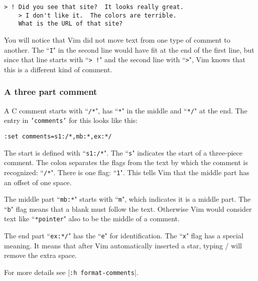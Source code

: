 \begin{Verbatim}[samepage=true]
    > ! Did you see that site?  It looks really great. 
    > I don't like it.  The colors are terrible. 
    What is the URL of that site? 
\end{Verbatim}

You will notice that Vim did not move text from one type of comment to another.
The ``\texttt{I}" in the second line would have fit at the end of the first line, but since that line starts with ``\texttt{> !}" and the second line with ``\texttt{>}", Vim knows that this is a different kind of comment.

\subsubsection{A three part comment}
A C comment starts with ``\texttt{/*}", has ``\texttt{*}" in the middle and ``\texttt{*/}" at the end.
The entry in \texttt{'comments'} for this looks like this:

\begin{Verbatim}[samepage=true]
 :set comments=s1:/*,mb:*,ex:*/
\end{Verbatim}

The start is defined with ``\texttt{s1:/*}".
The ``\texttt{s}" indicates the start of a three-piece comment.
The colon separates the flags from the text by which the comment is recognized: ``\texttt{/*}".
There is one flag: ``\texttt{1}".
This tells Vim that the middle part has an offset of one space.

The middle part ``\texttt{mb:*}" starts with ``\texttt{m}", which indicates it is a middle part.
The ``\texttt{b}" flag means that a blank must follow the text.
Otherwise Vim would consider text like ``\texttt{*pointer}" also to be the middle of a comment.

The end part ``\texttt{ex:*/}" has the ``\texttt{e}" for identification.
The ``\texttt{x}" flag has a special meaning.
It means that after Vim automatically inserted a star, typing / will remove the extra space.

For more details see |\texttt{:h format-comments}|.
\clearpage
